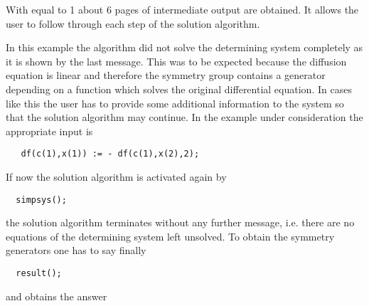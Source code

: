 With  equal to 1 about 6 pages of intermediate output are
obtained. It allows the user to follow through each step of the
solution algorithm.

In this example the algorithm did not solve the determining system
completely as it is shown by the last message. This was to be expected
because the diffusion equation is linear and therefore the symmetry
group contains a generator depending on a function which solves the
original differential equation. In cases like this the user has to
provide some additional information to the system so that the solution
algorithm may continue. In the example under consideration the
appropriate input is

\begin{verbatim}
   df(c(1),x(1)) := - df(c(1),x(2),2);
\end{verbatim}

If now the solution algorithm is activated again by

\begin{verbatim}
  simpsys();
\end{verbatim}

the solution algorithm terminates without any further message, i.e.
there are no equations of the determining system left unsolved. To
obtain the symmetry generators one has to say finally

\begin{verbatim}
  result();
\end{verbatim}

and obtains the answer

